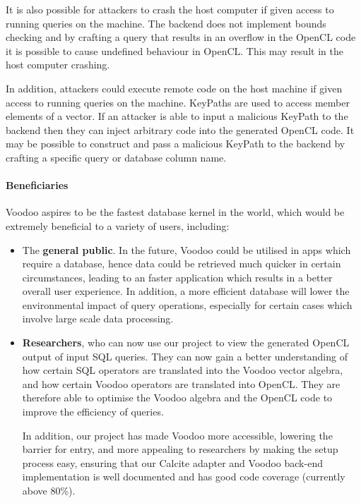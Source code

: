 It is also possible for attackers to crash the host computer if given access to running queries on the machine. The backend does not implement bounds checking and by crafting a query that results in an overflow in the OpenCL code it is possible to cause undefined behaviour in OpenCL. This may result in the host computer crashing.

In addition, attackers could execute remote code on the host machine if given access to running queries on the machine. KeyPaths are used to access member elements of a vector. If an attacker is able to input a malicious KeyPath to the backend then they can inject arbitrary code into the generated OpenCL code. It may be possible to construct and pass a malicious KeyPath to the backend by crafting a specific query or database column name.

\paragraph{Beneficiaries}

Voodoo aspires to be the fastest database kernel in the world, which would be extremely beneficial to a variety of users, including:

\begin{itemize}
    \item The \textbf{general public}. In the future, Voodoo could be utilised in apps which require a database, hence data could be retrieved much quicker in certain circumstances, leading to an faster application which results in a better overall user experience. In addition, a more efficient database will lower the environmental impact of query operations, especially for certain cases which involve large scale data processing.
    
    \item \textbf{Researchers}, who can now use our project to view the generated OpenCL output of input SQL queries. They can now gain a better understanding of how certain SQL operators are translated into the Voodoo vector algebra, and how certain Voodoo operators are translated into OpenCL. They are therefore able to optimise the Voodoo algebra and the OpenCL code to improve the efficiency of queries.
    
    In addition, our project has made Voodoo more accessible, lowering the barrier for entry, and more appealing to researchers by making the setup process easy, ensuring that our Calcite adapter and Voodoo back-end implementation is well documented and has good code coverage (currently above 80\%).
\end{itemize}


